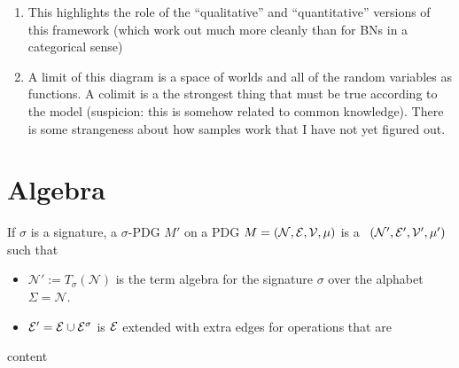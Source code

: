 {\begin{vcat}
\begin{enumerate}
		\item This highlights the role of the ``qualitative'' and ``quantitative'' versions of this framework (which work out much more cleanly than for BNs in a categorical sense)
		
		\item A limit of this diagram is a space of worlds and all of the random variables as functions. A colimit is a the strongest thing that must be true according to the model (suspicion: this is somehow related to common knowledge). There is some strangeness about how samples work that I have not yet figured out.
	\end{enumerate}
	
	
	\section{Algebra}\label{sec:algebra}
	\begin{defn}
		If $\sigma$ is a signature, a $\sigma$-PDG $M'$ on a PDG $M=(\mathcal N, \mathcal E, \mathcal V, \mu)$ is a \modelname\ $(\mathcal N', \mathcal E', \mathcal V', \mu')$ such that
		\begin{itemize}
			\item $\mathcal N':= T_\sigma(\mathcal N)$ is the term algebra for the signature $\sigma$ over the alphabet $\Sigma = \mathcal N$.
			\item $\mathcal E' = \mathcal E \cup \mathcal E^\sigma$ is $\mathcal E$ extended with extra edges for operations that are 
		\end{itemize}
	\end{defn}
	
	\begin{example}
		content
	\end{example}		
\end{vcat}

}
